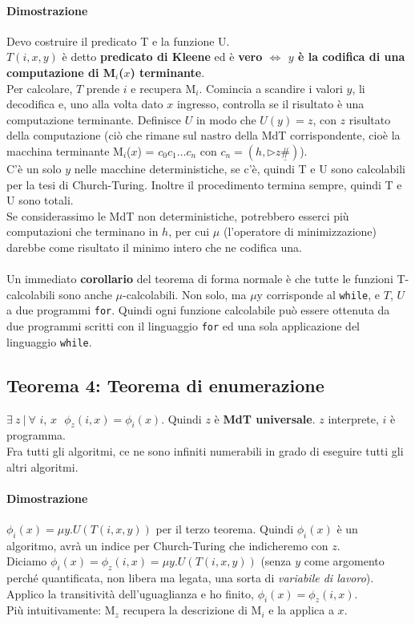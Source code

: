 \documentclass[10pt]{book}
\begin{document}
\paragraph{Dimostrazione} Devo costruire il predicato T e la funzione U.\\
$T(i, x, y)$ è detto \textbf{predicato di Kleene} ed è \textbf{vero $\Leftrightarrow$ $y$ è la codifica di una computazione di M$_i$($x$) terminante}.\\
Per calcolare, $T$ prende $i$ e recupera M$_i$. Comincia a scandire i valori $y$, li decodifica e, uno alla volta dato $x$ ingresso, controlla se il risultato è una computazione terminante. Definisce $U$ in modo che $U(y) = z$, con $z$ risultato della computazione (ciò che rimane sul nastro della MdT corrispondente, cioè la macchina terminante M$_i$($x$) = $c_0c_1\ldots c_n$ con $c_n=(h,\triangleright z \underline{\#})$).\\
C'è un solo $y$ nelle macchine deterministiche, se c'è, quindi T e U sono calcolabili per la tesi di Church-Turing. Inoltre il procedimento termina sempre, quindi T e U sono totali.\\
Se considerassimo le MdT non deterministiche, potrebbero esserci più computazioni che terminano in $h$, per cui $\mu$ (l'operatore di minimizzazione) darebbe come risultato il minimo intero che ne codifica una.\\\\
Un immediato \textbf{corollario} del teorema di forma normale è che tutte le funzioni T-calcolabili sono anche $\mu$-calcolabili. Non solo, ma $\mu$y corrisponde al \texttt{while}, e $T$, $U$ a due programmi \texttt{for}. Quindi ogni funzione calcolabile può essere ottenuta da due programmi scritti con il linguaggio \texttt{for} ed una sola applicazione del linguaggio \texttt{while}.
\subsection{Teorema 4: Teorema di enumerazione}
$\exists\: z\:|\:\forall$ $i$, $x\:\:\:\phi_z(i, x) = \phi_i(x)$. Quindi $z$ è \textbf{MdT universale}. $z$ interprete, $i$ è programma.\\
Fra tutti gli algoritmi, ce ne sono infiniti numerabili in grado di eseguire tutti gli altri algoritmi.\\
\paragraph{Dimostrazione} $\phi_i(x) = \mu y.U(T(i, x, y))$ per il terzo teorema. Quindi $\phi_i(x)$ è un algoritmo, avrà un indice per Church-Turing che indicheremo con $z$.\\
Diciamo $\phi_i(x) = \phi_z(i, x) = \mu y.U(T(i, x, y))$ (senza $y$ come argomento perché quantificata, non libera ma legata, una sorta di \textit{variabile di lavoro}). Applico la transitività dell'uguaglianza e ho finito, $\phi_i(x) = \phi_z(i, x)$.\\
Più intuitivamente: M$_z$ recupera la descrizione di M$_i$ e la applica a $x$.
\end{document}
